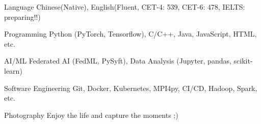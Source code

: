 

\begin{cvskills}

\cvskill
{Language} %
{Chinese(Native), English(Fluent, CET-4: 539, CET-6: 478, IELTS: preparing!!)} %

\cvskill
{Programming} %
{Python (PyTorch, Tensorflow), C/C++, Java, JavaScript, HTML, etc.} %

\cvskill
{AI/ML} %
{Federated AI (FedML, PySyft), Data Analysis (Jupyter, pandas, scikit-learn)} %

\cvskill
{Software Engineering} %
{Git, Docker, Kubernetes, MPI4py, CI/CD, Hadoop, Spark, etc.} %

\cvskill
{Photography} %
{Enjoy the life and capture the moments ;)} %


\end{cvskills}